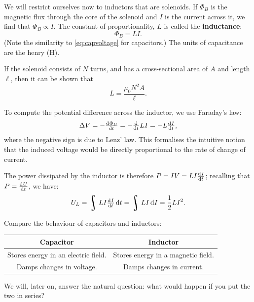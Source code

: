 \documentclass[a4paper]{amsbook}
\theoremstyle{definition}
\numberwithin{exercise}{chapter}
\numberwithin{exercise}{chapter}
\DeclareMathOperator*{\rint}{\scalerel*{\rotatebox{17}{$\!\int\!$}}{\int}}
\begin{document}
We will restrict ourselves now to inductors that are solenoids. If $ \Phi_B $ is the magnetic flux through the core of the solenoid and $ I $ is
the current across it, we find that $ \Phi_B \propto I $. The constant of proportionality, $ L $ is called the \textbf{inductance}:
\begin{equation}
  \Phi_B = LI.
\end{equation}
(Note the similarity to \cref{eq:capvoltage} for capacitors.) The units of capacitance are the henry (H).

If the solenoid consists of $ N $ turns, and has a cross-sectional area of $ A $ and length $ \ell $, then it can be shown that
\begin{equation}\label{eq:physicalinductance}
  L = \frac{\mu_0 N^2 A}{\ell}.
\end{equation}

To compute the potential difference across the inductor, we use Faraday's law:
\begin{equation}\label{eq:inductvolts}
  \Delta V = -\od{\Phi_B}{t} = -\od{}{t} LI = -L \od{I}{t},
\end{equation}
where the negative sign is due to Lenz' law. This formalises the intuitive notion that the induced voltage
would be directly proportional to the rate of change of current.

The power dissipated by the inductor is therefore $ P = IV = LI \od{I}{t} $; recalling that $ P = \od{U}{t} $, we have:
\begin{equation}
  U_L = \rint LI \od{I}{t} \dif{t} = \rint LI \dif{I} = \frac{1}{2} LI^2.
\end{equation}

Compare the behaviour of capacitors and inductors:
\begin{center}
  \begin{tabular}{|c|c|}\hline
    \textbf{Capacitor} & \textbf{Inductor}\\\hline
    Stores energy in an electric field. & Stores energy in a magnetic field.\\
    Damps changes in voltage. & Damps changes in current.\\\hline
  \end{tabular}
\end{center}

We will, later on, answer the natural question: what would happen if you put the two in series?
\end{document}
